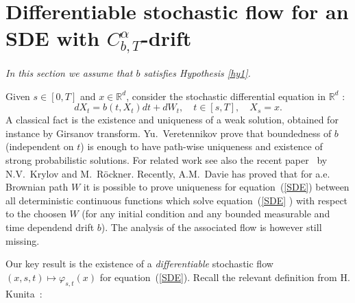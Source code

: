 \documentclass[a4paper,10pt]{article}
\begin{document}
\section{Differentiable stochastic flow for an SDE with $C_{b,T}^{{\alpha}}$-drift}

\label{sec:ito}

\textit{In this section we assume that $b$ satisfies  Hypothesis
\ref{hy1}. }

{Given }$s\in\left[  0,T\right]  $ and $x\in{\mathbb{R}}^{d}$, consider the
stochastic differential equation in ${\mathbb{R}}^{d}$ :
\begin{equation}
dX_{t}=b\left(  t,X_{t}\right)  dt+dW_{t},\quad t\in\left[  s,T\right]  ,\quad
X_{s}=x. \label{SDE}%
\end{equation}
A classical fact is the existence and uniqueness of a weak
solution, obtained for instance by Girsanov transform.
Yu.~Veretennikov \cite{V} prove that boundedness of $b$
(independent on $t$) is enough to have path-wise uniqueness and
existence of strong probabilistic solutions. For related work see
also the recent paper~\cite{Kry-Ro} by N.V.~Krylov and
M.~R\"ockner. Recently, A.M.~Davie has proved that for a.e.
Brownian path $W$ it is possible to prove uniqueness for
equation~(\ref{SDE})
between all deterministic continuous functions which solve equation~(\ref{SDE}%
) with respect to the choosen $W$ (for any initial condition and
any bounded measurable and time dependend drift $b$). The analysis
of the associated flow is however still missing.

\vskip 3mm

Our key result is the existence of a \emph{differentiable} stochastic flow
$(x,s,t)\mapsto\varphi_{s,t}(x)$ for equation~(\ref{SDE}). Recall the relevant
definition from H. Kunita~\cite{K}:
\end{document}
